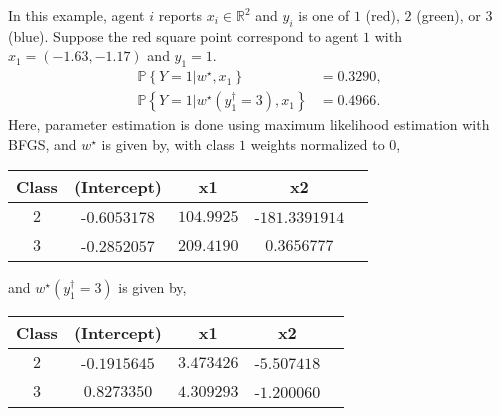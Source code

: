 \documentclass{article}
\begin{document}
In this example, agent $i $ reports $x_{i} \in \mathbb{R}^{2}$ and $y_{i}$ is one of $1$ (red), $2$ (green), or $3$ (blue). Suppose the red square point correspond to agent $1$ with $x_{1} = \left(-1.63, -1.17\right)$ and $y_{1} = 1$.
\begin{align*}
\mathbb{P}\left\{Y = 1 | w^\star , x_{1}\right\} &= 0.3290,
\\ \mathbb{P}\left\{Y = 1 | w^\star \left(y^{\dagger}_{1} = 3\right), x_{1}\right\} &= 0.4966.
\end{align*}
Here, parameter estimation is done using maximum likelihood estimation with BFGS, and $w^\star $ is given by, with class $1$ weights normalized to $0$,
\begin{center} \begin{tabular}{|c|c|c|c|c|}
\hline
 Class &(Intercept) &x1 &x2\\ \hline
$2$ &-$0.6053178$ &$104.9925$ &-$181.3391914$\\ \hline
$3$ &-$0.2852057$ &$209.4190$ &$0.3656777$\\ \hline
\end{tabular} \end{center}
and $w^\star \left(y^{\dagger}_{1} = 3\right)$ is given by,
\begin{center} \begin{tabular}{|c|c|c|c|c|}
\hline
 Class &(Intercept) &x1 &x2\\ \hline
$2$ &-$0.1915645$ &$3.473426$ &-$5.507418$\\ \hline
$3$ &$0.8273350$ &$4.309293$ &-$1.200060$\\ \hline
\end{tabular} \end{center}
\end{document}
